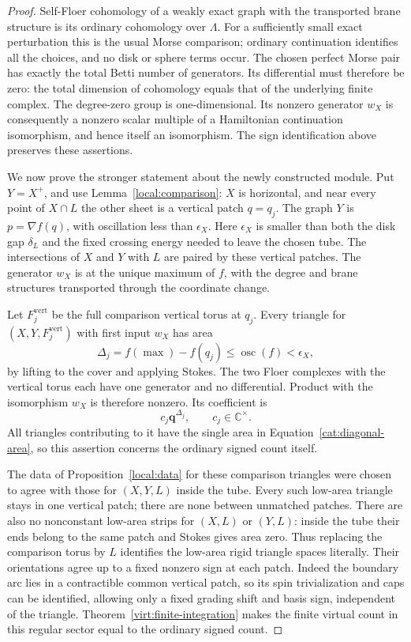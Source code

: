 \documentclass[11pt]{article}
\theoremstyle{definition}
\theoremstyle{remark}
\newcommand{\C}{\mathbb C}
\newcommand{\qnov}{\mathbf q}
\numberwithin{equation}{section}
\begin{document}
\begin{proof}
Self-Floer cohomology of a weakly exact graph with the transported brane
structure is its ordinary cohomology over \(\Lambda\).  For a sufficiently
small exact perturbation this is the usual Morse comparison; ordinary
continuation identifies all the choices, and no disk or sphere terms
occur.  The chosen perfect Morse pair has exactly the total Betti
number of generators.  Its differential must therefore be zero:
the total dimension of cohomology equals that of the underlying finite
complex.  The degree-zero group is one-dimensional.  Its nonzero
generator \(w_X\) is consequently a nonzero scalar multiple of a
Hamiltonian continuation isomorphism, and hence itself an isomorphism.
The sign identification above preserves these assertions.

We now prove the stronger statement about the newly constructed
module.  Put \(Y=X^+\), and use Lemma~\ref{local:comparison}:
\(X\) is horizontal, and near every point of
\(X\cap L\) the other sheet is a vertical patch \(q=q_j\).
The graph \(Y\) is \(p=\nabla f(q)\), with oscillation less than
\(\epsilon_X\).  Here \(\epsilon_X\) is smaller than both the disk gap
\(\delta_L\) and the fixed crossing energy needed to leave the chosen
tube.  The intersections of \(X\) and \(Y\) with \(L\) are paired by
these vertical patches.  The generator \(w_X\) is at the unique maximum
of \(f\), with the degree and brane structures transported through the
coordinate change.

Let \(F_j^{\mathrm{vert}}\) be the full comparison vertical torus at
\(q_j\).  Every triangle for
\((X,Y,F_j^{\mathrm{vert}})\) with first input \(w_X\) has area
\begin{equation}\label{cat:diagonal-area}
 \Delta_j=f(\max)-f(q_j)\le\operatorname{osc}(f)<\epsilon_X,
\end{equation}
by lifting to the cover and applying Stokes.
The two Floer complexes with the vertical torus each have one
generator and no differential.  Product with the isomorphism \(w_X\)
is therefore nonzero.  Its coefficient is
\[
 c_j\qnov^{\Delta_j},\qquad c_j\in\C^\times.
\]
All triangles contributing to it have the single area in
Equation~\eqref{cat:diagonal-area}, so this assertion concerns the
ordinary signed count itself.

The data of Proposition~\ref{local:data} for these comparison triangles
were chosen to agree with
those for \((X,Y,L)\) inside the tube.  Every such low-area triangle
stays in one vertical patch; there are none between unmatched patches.
There are also no nonconstant low-area strips for \((X,L)\) or
\((Y,L)\): inside the tube their ends belong to the same patch and
Stokes gives area zero.  Thus replacing the comparison torus by \(L\)
identifies the low-area rigid triangle spaces literally.
Their orientations agree up to a fixed nonzero sign at each patch.
Indeed the boundary arc lies in a contractible common vertical patch,
so its spin trivialization and caps can be identified, allowing only
a fixed grading shift and basis sign, independent of the triangle.
Theorem~\ref{virt:finite-integration} makes the finite virtual count in
this regular sector equal to the ordinary signed count.


\end{proof}
\end{document}
